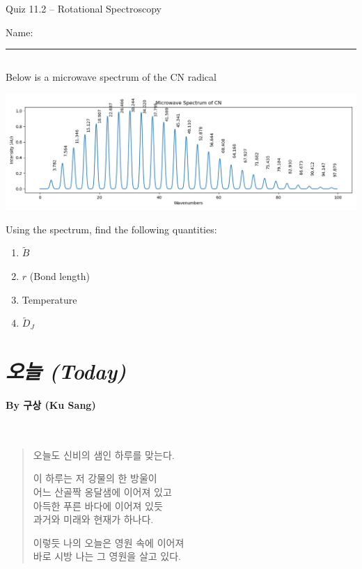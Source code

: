 \documentclass[11pt, letterpaper]{memoir}
\begin{document}
\begin{center}
	{\large Quiz 11.2 -- Rotational Spectroscopy}
\end{center}
{\large Name: \rule[-1mm]{4in}{.1pt}

\subsection*{}
Below is a microwave spectrum of the CN radical

\noindent
\includegraphics[trim= 0 0 0 0, clip=true, width=\linewidth]{CN_Microwave}

\noindent
Using the spectrum, find the following quantities:
\begin{enumerate}
	\item $\tilde{B}$
	\item $r$ (Bond length)
	\item Temperature
	\item $\tilde{D}_J$
\end{enumerate}

\newpage
\pagestyle{empty}
\addtocounter{page}{-1}
\section*{\emph{{오늘} (Today)}}
\paragraph{By {구상} (Ku Sang)}~

{
\begin{verse}
	오늘도 신비의 샘인 하루를 맞는다.

	이 하루는 저 강물의 한 방울이\\
	어느 산골짝 옹달샘에 이어져 있고\\
	아득한 푸른 바다에 이어져 있듯\\
	과거와 미래와 현재가 하나다.

	이렇듯 나의 오늘은 영원 속에 이어져\\
	바로 시방 나는 그 영원을 살고 있다.


\end{verse}}}
\end{document}
